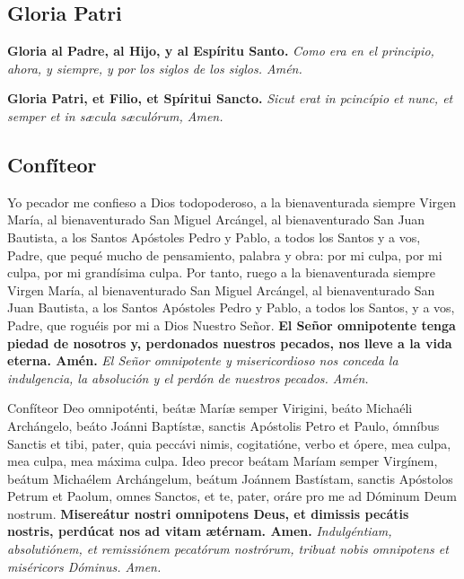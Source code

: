 \documentclass[./devocionario.tex]{subfiles}
\begin{document}
\subsection*{Gloria Patri}
\begin{multicols}{2}
    \textbf{Gloria al Padre, al Hijo, y al Espíritu Santo.}\newline
    \textit{Como era en el principio, ahora, y siempre, y por los siglos de los siglos. Amén.}\newline
    
    \columnbreak
    
    \textbf{Gloria Patri, et Filio, et Spíritui Sancto.}\newline
    \textit{Sicut erat in pcincípio et nunc, et semper et in sæcula sæculórum, Amen.}
\end{multicols}

\subsection*{Confíteor}
\begin{multicols}{2}
    Yo pecador me confieso a Dios todopoderoso, a la bienaventurada siempre Virgen María, al bienaventurado San Miguel Arcángel, 
    al bienaventurado San Juan Bautista, a los Santos Apóstoles Pedro y Pablo, a todos los Santos y a vos, Padre, que pequé mucho 
    de pensamiento, palabra y obra: por mi culpa, por mi culpa, por mi grandísima culpa. Por tanto, ruego a la bienaventurada 
    siempre Virgen María, al bienaventurado San Miguel Arcángel, al bienaventurado San Juan Bautista, a los Santos Apóstoles 
    Pedro y Pablo, a todos los Santos, y a vos, Padre, que roguéis por mi a Dios Nuestro Señor.\newline
    \textbf{El Señor omnipotente tenga piedad de nosotros y, perdonados nuestros pecados, nos lleve a la vida eterna. Amén.}\newline
    \textit{El Señor omnipotente y misericordioso nos conceda la indulgencia, la absolución y el perdón de nuestros pecados. Amén.}

    \columnbreak

    Confíteor Deo omnipoténti, beátæ Maríæ semper Virigini, beáto Michaéli Archángelo, beáto Joánni Baptístæ, sanctis Apóstolis Petro et Paulo, 
    ómníbus Sanctis et tibi, pater, quia peccávi nimis, cogitatióne, verbo et ópere, mea culpa, mea culpa, mea máxima culpa. Ideo precor beátam 
    Maríam semper Virgínem, beátum Michaélem Archángelum, beátum Joánnem Bastístam, sanctis Apóstolos Petrum et Paolum, omnes Sanctos, et te, pater, 
    oráre pro me ad Dóminum Deum nostrum.\newline
    \textbf{Misereátur nostri omnipotens Deus, et dimissis pecátis nostris, perdúcat nos ad vitam ætérnam. Amen.}\newline
    \textit{Indulgéntiam, absolutiónem, et remissiónem pecatórum nostrórum, tribuat nobis omnipotens et miséricors Dóminus. Amen.}
\end{multicols}
\end{document}

